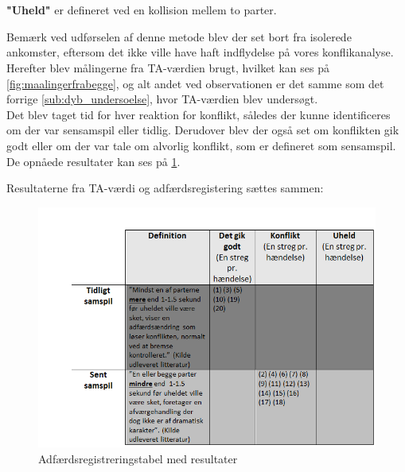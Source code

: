 \\\\
\textbf{"Uheld"} er defineret ved en kollision mellem to parter.

Bemærk ved udførselen af denne metode blev der set bort fra isolerede ankomster, eftersom det ikke ville have haft indflydelse på vores konflikanalyse. Herefter blev målingerne fra TA-værdien brugt, hvilket kan ses på \cref{fig:maalingerfrabegge}, og alt andet ved observationen er det samme som det forrige \cref{sub:dyb_undersoelse}, hvor TA-værdien blev undersøgt.
\\
Det blev taget tid for hver reaktion for konflikt, således der kunne identificeres om der var sensamspil eller tidlig. Derudover blev der også set om konflikten gik godt eller om der var tale om alvorlig konflikt, som er defineret som sensamspil. De opnåede resultater kan ses på \cref{fig:adfregtabelresult}.


Resultaterne fra TA-værdi og adfærdsregistering sættes sammen:
\begin{figure}[htbp]
  \label{fig:adfregtabelresult}
  \centering
  \begin{adjustbox}{max width=\textwidth}
    \includegraphics{billederogfigur/obstabelresult.png} %
 \end{adjustbox}
  \caption{Adfærdsregistreringstabel med resultater}
\end{figure}

